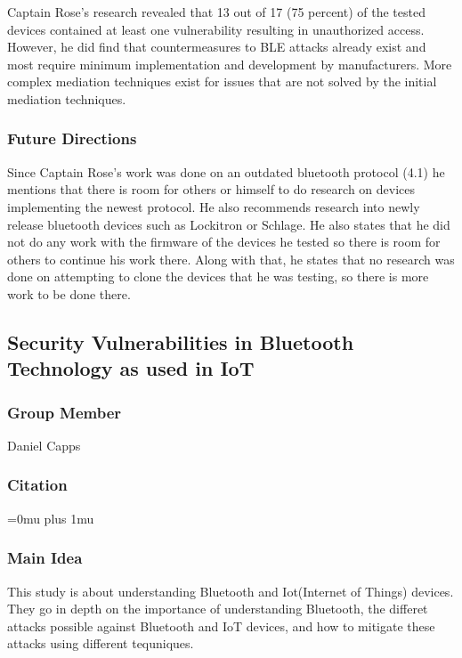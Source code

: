 \documentclass[letterpaper,12pt]{article}
\begin{document}
\noindent
Captain Rose's research revealed that 13 out of 17 (75 percent) of the tested devices contained at least one vulnerability resulting in unauthorized access. However, he did find that countermeasures to BLE attacks already exist and most require minimum implementation and development by manufacturers. More complex mediation techniques exist for issues that are not solved by the initial mediation techniques.

\subsubsection{Future Directions}

\noindent
Since Captain Rose's work was done on an outdated bluetooth protocol (4.1) he mentions that there is room for others or himself to do research on devices implementing the newest protocol. He also recommends research into newly release bluetooth devices such as Lockitron or Schlage. He also states that he did not do any work with the firmware of the devices he tested so there is room for others to continue his work there. Along with that, he states that no research was done on attempting to clone the devices that he was testing, so there is more work to be done there.

\noindent
\subsection{Security Vulnerabilities in Bluetooth Technology as used in IoT}

\subsubsection{Group Member}

\noindent
Daniel Capps

\noindent
\subsubsection{Citation}

\Urlmuskip=0mu plus 1mu\relax
{}

\subsubsection{Main Idea}

\noindent
This study is about understanding Bluetooth and Iot(Internet of Things) devices. They go in depth on the importance of understanding Bluetooth, the differet attacks possible against Bluetooth and IoT devices, and how to mitigate these attacks using different tequniques.  
\end{document}
